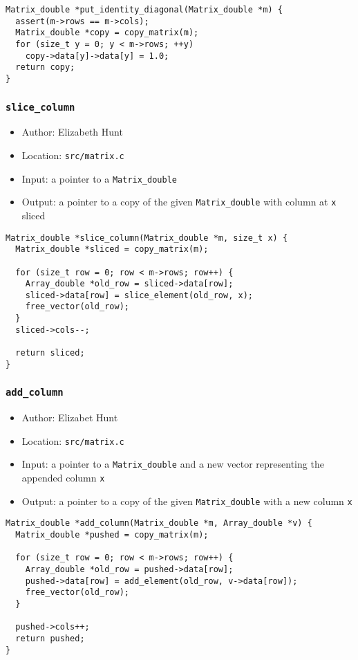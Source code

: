 \documentclass[11pt]{article}
\begin{document}
\begin{verbatim}
Matrix_double *put_identity_diagonal(Matrix_double *m) {
  assert(m->rows == m->cols);
  Matrix_double *copy = copy_matrix(m);
  for (size_t y = 0; y < m->rows; ++y)
    copy->data[y]->data[y] = 1.0;
  return copy;
}
\end{verbatim}

\subsubsection{\texttt{slice\_column}}
\label{sec:org1ea6d1a}
\begin{itemize}
\item Author: Elizabeth Hunt
\item Location: \texttt{src/matrix.c}
\item Input: a pointer to a \texttt{Matrix\_double}
\item Output: a pointer to a copy of the given \texttt{Matrix\_double} with column at \texttt{x} sliced
\end{itemize}

\begin{verbatim}
Matrix_double *slice_column(Matrix_double *m, size_t x) {
  Matrix_double *sliced = copy_matrix(m);

  for (size_t row = 0; row < m->rows; row++) {
    Array_double *old_row = sliced->data[row];
    sliced->data[row] = slice_element(old_row, x);
    free_vector(old_row);
  }
  sliced->cols--;

  return sliced;
}
\end{verbatim}

\subsubsection{\texttt{add\_column}}
\label{sec:org733cc61}
\begin{itemize}
\item Author: Elizabet Hunt
\item Location: \texttt{src/matrix.c}
\item Input: a pointer to a \texttt{Matrix\_double} and a new vector representing the appended column \texttt{x}
\item Output: a pointer to a copy of the given \texttt{Matrix\_double} with a new column \texttt{x}
\end{itemize}

\begin{verbatim}
Matrix_double *add_column(Matrix_double *m, Array_double *v) {
  Matrix_double *pushed = copy_matrix(m);

  for (size_t row = 0; row < m->rows; row++) {
    Array_double *old_row = pushed->data[row];
    pushed->data[row] = add_element(old_row, v->data[row]);
    free_vector(old_row);
  }

  pushed->cols++;
  return pushed;
}
\end{verbatim}
\end{document}
